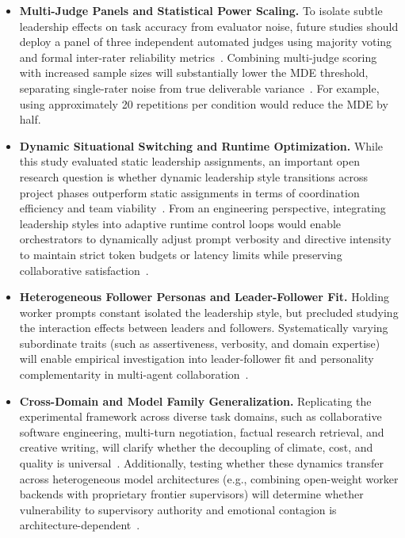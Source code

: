 \begin{itemize}
    \item \textbf{Multi-Judge Panels and Statistical Power Scaling.}
    To isolate subtle leadership effects on task accuracy from evaluator noise, future studies should deploy a panel of three independent automated judges using majority voting and formal inter-rater reliability metrics~\cite{chen2025multiagentasjudgealigningllmagentbasedautomated, zheng2023judgingllmasajudgemtbenchchatbot}.
    Combining multi-judge scoring with increased sample sizes will substantially lower the \ac{MDE} threshold, separating single-rater noise from true deliverable variance~\cite{yehudai2026surveyevaluationllmbasedagents}.
    For example, using approximately 20 repetitions per condition would reduce the \ac{MDE} by half.

    \item \textbf{Dynamic Situational Switching and Runtime Optimization.}
    While this study evaluated static leadership assignments, an important open research question is whether dynamic leadership style transitions across project phases outperform static assignments in terms of coordination efficiency and team viability~\cite{world6020063, dang2025multiagentcollaborationevolvingorchestration}.
    From an engineering perspective, integrating leadership styles into adaptive runtime control loops would enable orchestrators to dynamically adjust prompt verbosity and directive intensity to maintain strict token budgets or latency limits while preserving collaborative satisfaction~\cite{zhang2024cutcrapeconomicalcommunication, wang2025agentdropoutdynamicagentelimination}.

    \item \textbf{Heterogeneous Follower Personas and Leader-Follower Fit.}
    Holding worker prompts constant isolated the leadership style, but precluded studying the interaction effects between leaders and followers.
    Systematically varying subordinate traits (such as assertiveness, verbosity, and domain expertise) will enable empirical investigation into leader-follower fit and personality complementarity in multi-agent collaboration~\cite{barrick1998personalityteamwork, duan2025powerpersonalityhumansimulation, zhang2024exploringcollaborationmechanismsllm}.

    \item \textbf{Cross-Domain and Model Family Generalization.}
    Replicating the experimental framework across diverse task domains, such as collaborative software engineering, multi-turn negotiation, factual research retrieval, and creative writing, will clarify whether the decoupling of climate, cost, and quality is universal~\cite{qian2024chatdevcommunicativeagentssoftware, li2023camelcommunicativeagentsmind, chen2023agentversefacilitatingmultiagentcollaboration}.
    Additionally, testing whether these dynamics transfer across heterogeneous model architectures (e.g., combining open-weight worker backends with proprietary frontier supervisors) will determine whether vulnerability to supervisory authority and emotional contagion is architecture-dependent~\cite{lacava2025openmodelsclosedminds, ashery2025emergentsocial}.


\end{itemize}
